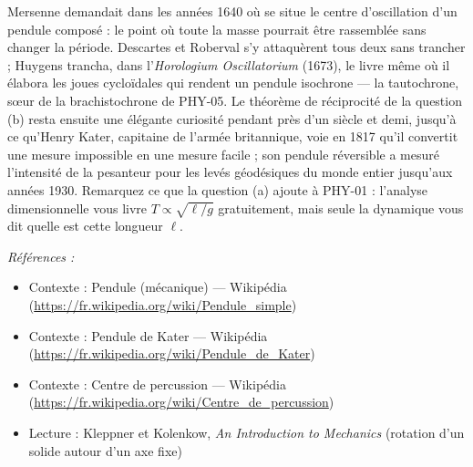 \documentclass[11pt]{article}
\newenvironment{refs}{\par\small\noindent\emph{Références :}\begin{itemize}\setlength\itemsep{0pt}}{\end{itemize}\normalsize}
\begin{document}
\noindent Mersenne demandait dans les années 1640 où se situe le centre d'oscillation
d'un pendule composé : le point où toute la masse pourrait être rassemblée sans changer la
période. Descartes et Roberval s'y attaquèrent tous deux sans trancher ; Huygens trancha, dans
l'\textit{Horologium Oscillatorium} (1673), le livre même où il élabora les joues cycloïdales qui
rendent un pendule isochrone --- la tautochrone, s\oe{}ur de la brachistochrone de PHY-05. Le théorème
de réciprocité de la question (b) resta ensuite une élégante curiosité pendant près d'un siècle et
demi, jusqu'à ce qu'Henry Kater, capitaine de l'armée britannique, voie en 1817 qu'il convertit
une mesure impossible en une mesure facile ; son pendule réversible a mesuré l'intensité de la
pesanteur pour les levés géodésiques du monde entier jusqu'aux années 1930. Remarquez ce que la
question (a) ajoute à PHY-01 : l'analyse dimensionnelle vous livre $ T \propto \sqrt{\ell/g} $
gratuitement, mais seule la dynamique vous dit quelle est cette longueur $ \ell $.

\begin{refs}
\item Contexte : Pendule (mécanique) --- Wikipédia (\url{https://fr.wikipedia.org/wiki/Pendule_simple})
\item Contexte : Pendule de Kater --- Wikipédia (\url{https://fr.wikipedia.org/wiki/Pendule_de_Kater})
\item Contexte : Centre de percussion --- Wikipédia (\url{https://fr.wikipedia.org/wiki/Centre_de_percussion})
\item Lecture : Kleppner et Kolenkow, \textit{An Introduction to Mechanics} (rotation d'un solide autour d'un axe fixe)
\end{refs}

\bigskip
\end{document}
